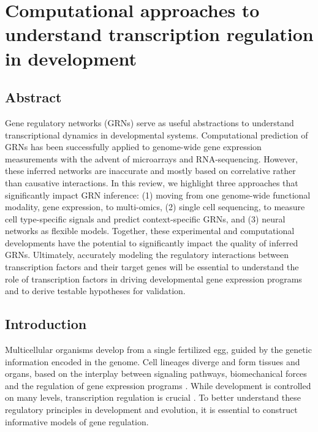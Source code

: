 \chapter{Computational approaches to understand transcription regulation in development}\thumbforchapter
{}
\newpage
\section{Abstract}

Gene regulatory networks (GRNs) serve as useful abstractions to understand transcriptional dynamics in developmental systems. Computational prediction of GRNs has been successfully applied to genome-wide gene expression measurements with the advent of microarrays and RNA-sequencing. However, these inferred networks are inaccurate and mostly based on correlative rather than causative interactions. In this review, we highlight three approaches that significantly impact GRN inference: (1) moving from one genome-wide functional modality, gene expression, to multi-omics, (2) single cell sequencing, to measure cell type-specific signals and predict context-specific GRNs, and (3) neural networks as flexible models. Together, these experimental and computational developments have the potential to significantly impact the quality of inferred GRNs. Ultimately, accurately modeling the regulatory interactions between transcription factors and their target genes will be essential to understand the role of transcription factors in driving developmental gene expression programs and to derive testable hypotheses for validation.

\section{Introduction}

Multicellular organisms develop from a single fertilized egg, guided by the genetic information encoded in the genome. Cell lineages diverge and form tissues and organs, based on the interplay between signaling pathways, biomechanical forces \cite{Mammoto_2012} and the regulation of gene expression programs \cite{Cameron_1987}. While development is controlled on many levels, transcription regulation is crucial \cite{Cooper2000}. To better understand these regulatory principles in development and evolution, it is essential to construct informative models of gene regulation.

